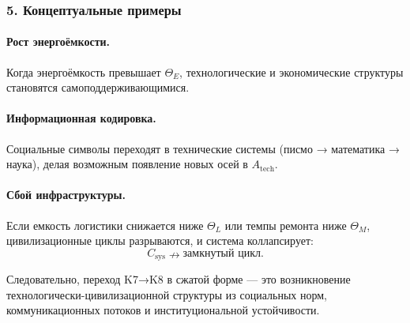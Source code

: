 \subsubsection{5. Концептуальные примеры}

\paragraph{Рост энергоёмкости.}
Когда энергоёмкость превышает $\Theta_E$, технологические и экономические
структуры становятся самоподдерживающимися.

\paragraph{Информационная кодировка.}
Социальные символы переходят в технические системы (писмо → математика →
наука), делая возможным появление новых осей в $A_{\mathrm{tech}}$.

\paragraph{Сбой инфраструктуры.}
Если емкость логистики снижается ниже $\Theta_L$ или темпы ремонта ниже
$\Theta_M$, цивилизационные циклы разрываются, и система коллапсирует:
\[
C_{\mathrm{sys}} \nrightarrow \text{замкнутый цикл}.
\]

Следовательно, переход K7→K8 в сжатой форме — это возникновение
технологически-цивилизационной структуры из социальных норм, коммуникационных
потоков и институциональной устойчивости.
